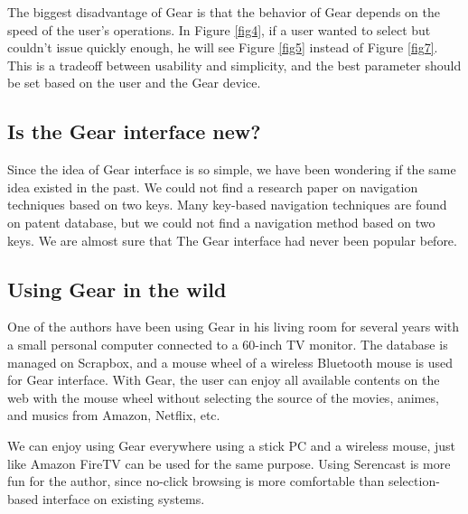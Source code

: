 \documentclass[conference]{IEEEtran}
\def\down{\tsf{▼}}
\def\SC{Serencast}
\def\SB{Scrapbox}
\begin{document}
The biggest disadvantage of Gear is that
the behavior of Gear depends on the speed of the user's operations.
In Figure \ref{fig4},
if a user wanted to select  but couldn't issue {\down}
quickly enough, he will see Figure \ref{fig5} instead of Figure \ref{fig7}.
This is a tradeoff between usability and simplicity, and
the best parameter should be set based on the user and the Gear device.

\subsection{Is the Gear interface new?}

Since the idea of Gear interface is so simple,
we have been wondering if the same idea existed in the past.
%
We could not find a research paper on 
navigation techniques based on two keys.
Many key-based navigation techniques are found on patent database,
but we could not find a navigation method based on two keys.
We are almost sure that The Gear interface had never been popular before.

\subsection{Using Gear in the wild}

One of the authors have been using Gear in his living room for several years
with a small personal computer connected to a 60-inch TV monitor.
The database is managed on {\SB}, and
a mouse wheel of a wireless Bluetooth mouse is used for Gear interface.
With Gear, the user can enjoy all available contents on the web with the mouse wheel
without selecting the source of the movies, animes, and musics from Amazon, Netflix, etc.

We can enjoy using Gear everywhere using a stick PC and a wireless mouse,
just like Amazon FireTV can be used for the same purpose.
Using {\SC} is more fun for the author, since no-click browsing is more comfortable than
selection-based interface on existing systems.

\end{document}
